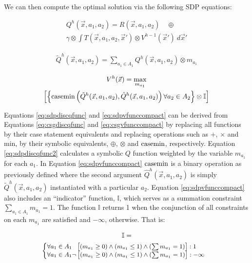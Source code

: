 We can then compute the optimal solution via the following SDP equations:

{\footnotesize 
\abovedisplayskip=0pt
\belowdisplayskip=0pt
\begin{multline}
\label{eq:sdpdiscqfunc}
  Q^{h}(\vec{x}, a_1, a_2) = R(\vec{x}, a_1, a_2) \quad \oplus \\
  \gamma \otimes \int T(\vec{x}, a_1, a_2, \vec{x}') \otimes V^{h-1}(\vec{x}')\ d\vec{x}' 
\end{multline}
}%

{\footnotesize 
\abovedisplayskip=0pt
\belowdisplayskip=0pt
\begin{multline}
\label{eq:sdpdiscqfunc2}
  \tilde{Q}^{h}(\vec{x}, a_1, a_2) = \sum_{a_1 \in A_1} Q^{h}(\vec{x}, a_1, a_2) \otimes m_{a_{1}}
\end{multline}
}%

{\footnotesize 
\abovedisplayskip=0pt
\belowdisplayskip=0pt
\begin{multline}
\label{eq:sdpvfunccompact}
  V^{h}(\vec{x}) = \max_{m_{a_1}} \\ \left[ \left\{ \casemin \left( \tilde{Q}^{h}(\vec{x}, a_1, a_2),  \hat{Q}^{h}(\vec{x}, a_1, a_2) \right)  \forall a_2 \in A_2 \right\} \otimes \mathbb{I} \right]
\end{multline}
}%

Equations \eqref{eq:sdpdiscqfunc} and \eqref{eq:sdpvfunccompact} can
be derived from Equations \eqref{eq:csgdiscqfunc} and \eqref{eq:csgvfunccompact}
by replacing all functions by their case statement equivalents and replacing
operations such as $+$, $\times$ and min, by their symbolic equivalents,
$\oplus$, $\otimes$ and $\mathrm{casemin}$, respectively. Equation \eqref{eq:sdpdiscqfunc2}
calculates a symbolic $Q$ function weighted 
by the variable $m_{a_{1}}$ for each $a_1$. In Equation \eqref{eq:sdpvfunccompact} 
$\mathrm{casemin}$ is a binary operation as previously defined where the
second argument $\hat{Q}^{h}(\vec{x}, a_1, a_2)$ is simply
$\tilde{Q}^{h}(\vec{x}, a_1, a_2)$ instantiated with a particular $a_2$.
Equation \eqref{eq:sdpvfunccompact} 
also includes an ``indicator'' function, $\mathbb{I}$, which serves as a summation constraint 
$\sum_{a_{1} \in A_1} m_{a_{1}} = 1$. The function $\mathbb{I}$
returns 1 when the conjunction of all constraints on each $m_{a_1}$ are satisfied
and $-\infty$, otherwise. That is:

\vspace{-2.5mm}
{\small 
\abovedisplayskip=0pt
\belowdisplayskip=0pt
\begin{multline*}
  \mathbb{I} = \\
  {\footnotesize
    \begin{cases}
      \forall a_{1} \in A_1 \hspace{6pt}\left[(m_{a_{1}} \geq 0) \wedge (m_{a_{1}} \leq 1 ) \wedge (\sum m_{a_{1}} = 1) \right]: 1 \\ 
      \forall a_{1} \in A_1 \neg \left[(m_{a_{1}} \geq 0) \wedge (m_{a_{1}} \leq 1 ) \wedge (\sum m_{a_{1}} = 1) \right]: -\infty \\ 
    \end{cases} \nonumber
   }
\end{multline*}
}%

